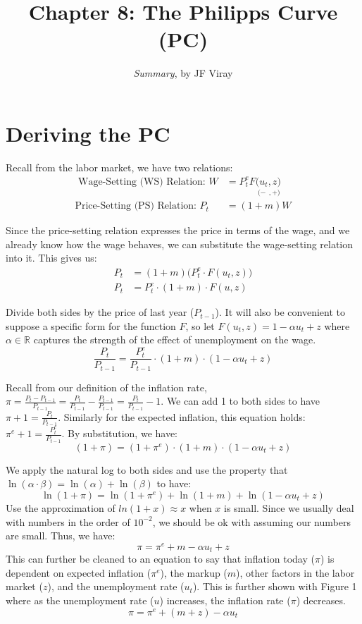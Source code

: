 \documentclass{extarticle}
\title{\vspace{-2em}Chapter 8: The Philipps Curve (PC)}
\author{\emph{Summary}, by JF Viray}
\date{}
\begin{document}
\maketitle

\section{Deriving the PC}
Recall from the labor market, we have two relations:
\begin{align*}
    \text{ Wage-Setting (WS) Relation: } W &= P_t^e F\underset{(-}{(u_t}\underset{, +)}{, z)}  \\
    \text{Price-Setting (PS) Relation: } P_t &= (1+m) W 
\end{align*}

Since the price-setting relation expresses the price in terms of the wage, and we already know how the wage behaves, we can substitute the wage-setting relation into it. This gives us:
\begin{align*}
    P_t &= (1+m)\big(P_t^e \cdot F(u_t, z)\big) \\
    P_t &= P_t^e \cdot (1+m)  \cdot F(u, z)
\end{align*}

Divide both sides by the price of last year ($P_{t-1}$). It will also be convenient to suppose a specific form for the function $F$, so let $F(u_t, z) = 1 - \alpha u_t + z$ where $\alpha \in \mathbb{R}$ captures the strength of the effect of unemployment on the wage.
$$\frac{P_t}{P_{t-1}} = \frac{P_t^e}{P_{t-1}} \cdot (1+m) \cdot (1-\alpha u_t + z)$$

Recall from our definition of the inflation rate, $\pi = \frac{P_t - P_{t-1}}{P_{t-1}} = \frac{P_t}{P_{t-1}} - \frac{P_{t-1}}{P_{t-1}} = \frac{P_t}{P_{t-1}} - 1$. We can add 1 to both sides to have $\pi + 1 = \frac{P_t}{P_{t-1}}$. 
Similarly for the expected inflation, this equation holds: $\pi^e + 1 = \frac{P_t^e}{P_{t-1}}$. By substitution, we have:
$$(1+\pi) = (1+\pi^e) \cdot (1+m) \cdot (1-\alpha u_t + z)$$ 

We apply the natural log to both sides and use the property that $\ln(\alpha \cdot \beta) = \ln(\alpha) + \ln(\beta)$ to have:
$$\ln (1+\pi) = \ln (1+\pi^e) + \ln (1+m) + \ln (1-\alpha u_t + z)$$
Use the approximation of $ln(1+x) \approx x$ when $x$ is small. Since we usually deal with numbers in the order of $10^{-2}$, we should be ok with assuming our numbers are small. Thus, we have:
$$\pi = \pi^e + m - \alpha u_t + z$$
This can further be cleaned to an equation to say that inflation today ($\pi$) is dependent on expected inflation ($\pi^e$), the markup ($m$), other factors in the labor market ($z$), and the unemployment rate ($u_t$). This is further shown with Figure 1 where as the unemployment rate ($u$) increases, the inflation rate ($\pi$) decreases.
$$\pi = \pi^e + (m+z) - \alpha u_t$$
\end{document}
